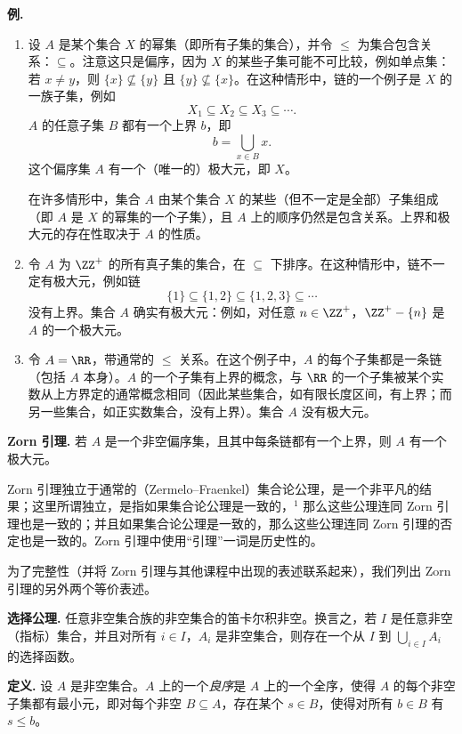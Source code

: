 \noindent\textbf{例.}
\begin{enumerate}[label=(\arabic*)]
  \item 设 $A$ 是某个集合 $X$ 的幂集（即所有子集的集合），并令 $\leq$ 为集合包含关系：$\subseteq$。注意这只是偏序，因为 $X$ 的某些子集可能不可比较，例如单点集：若 $x\neq y$，则 $\{x\}\nsubseteq\{y\}$ 且 $\{y\}\nsubseteq\{x\}$。在这种情形中，链的一个例子是 $X$ 的一族子集，例如
  \[
    X_1\subseteq X_2\subseteq X_3\subseteq\cdots.
  \]
  $A$ 的任意子集 $B$ 都有一个上界 $b$，即
  \[
    b=\bigcup_{x\in B}x.
  \]
  这个偏序集 $A$ 有一个（唯一的）极大元，即 $X$。

  在许多情形中，集合 $A$ 由某个集合 $X$ 的某些（但不一定是全部）子集组成（即 $A$ 是 $X$ 的幂集的一个子集），且 $A$ 上的顺序仍然是包含关系。上界和极大元的存在性取决于 $A$ 的性质。

  \item 令 $A$ 为 $\ZZ^+$ 的所有真子集的集合，在 $\subseteq$ 下排序。在这种情形中，链不一定有极大元，例如链
  \[
    \{1\}\subseteq\{1,2\}\subseteq\{1,2,3\}\subseteq\cdots
  \]
  没有上界。集合 $A$ 确实有极大元：例如，对任意 $n\in\ZZ^+$，$\ZZ^+-\{n\}$ 是 $A$ 的一个极大元。

  \item 令 $A=\RR$，带通常的 $\leq$ 关系。在这个例子中，$A$ 的每个子集都是一条链（包括 $A$ 本身）。$A$ 的一个子集有上界的概念，与 $\RR$ 的一个子集被某个实数从上方界定的通常概念相同（因此某些集合，如有限长度区间，有上界；而另一些集合，如正实数集合，没有上界）。集合 $A$ 没有极大元。
\end{enumerate}

\medskip
\noindent\textbf{Zorn 引理.} 若 $A$ 是一个非空偏序集，且其中每条链都有一个上界，则 $A$ 有一个极大元。

Zorn 引理独立于通常的（Zermelo--Fraenkel）集合论公理，是一个非平凡的结果；这里所谓独立，是指如果集合论公理是一致的，$^{1}$ 那么这些公理连同 Zorn 引理也是一致的；并且如果集合论公理是一致的，那么这些公理连同 Zorn 引理的否定也是一致的。Zorn 引理中使用“引理”一词是历史性的。

为了完整性（并将 Zorn 引理与其他课程中出现的表述联系起来），我们列出 Zorn 引理的另外两个等价表述。

\medskip
\noindent\textbf{选择公理.} 任意非空集合族的非空集合的笛卡尔积非空。换言之，若 $I$ 是任意非空（指标）集合，并且对所有 $i\in I$，$A_i$ 是非空集合，则存在一个从 $I$ 到 $\bigcup_{i\in I}A_i$ 的选择函数。

\noindent\textbf{定义.} 设 $A$ 是非空集合。$A$ 上的一个\emph{良序}是 $A$ 上的一个全序，使得 $A$ 的每个非空子集都有最小元，即对每个非空 $B\subseteq A$，存在某个 $s\in B$，使得对所有 $b\in B$ 有 $s\leq b$。

